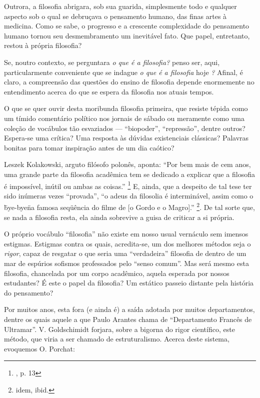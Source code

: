 \documentclass[12pt,a4paper]{article}
\begin{document}
	Outrora, a filosofia abrigara, sob sua guarida, simplesmente todo e 
	qualquer aspecto sob o qual se debruçava o pensamento humano, das 
	finas artes à medicina. Como se sabe, o progresso e a crescente 
	complexidade do pensamento humano tornou seu desmembramento um 
	inevitável fato. Que papel, entretanto, restou à própria filosofia? 

	Se, noutro contexto, se perguntara \textit{o que é a filosofia?} 
	penso ser, aqui, particularmente conveniente que se indague 
	\textit{o que é a filosofia} hoje \textit{?} Afinal, é claro, 
	a compreensão das questões do ensino de filosofia depende 
	enormemente no entendimento acerca do que se espera da filosofia 
	nos atuais tempos. 

	O que se quer ouvir desta moribunda filosofia primeira, que 
	resiste tépida como um tímido comentário político nos jornais de 
	sábado ou meramente como uma coleção de vocábulos tão esvaziados 
	--- “biopoder”, “repressão”, dentre outros? Espera-se uma crítica? 
	Uma resposta às dúvidas existenciais clássicas? Palavras bonitas 
	para tomar inspiração antes de um dia caótico? 

	Leszek Kolakowski, arguto filósofo polonês, aponta: “Por bem mais 
	de cem anos, uma grande parte da filosofia acadêmica tem se 
	dedicado a explicar que a filosofia é impossível, inútil ou 
	ambas as coisas.” \footnote{\cite{lkmeta}, p. 13}
	E, ainda, que a despeito de tal tese ter sido 
	inúmeras vezes “provada”, “o adeus da filosolia é interminável, assim 
	como o \"bye-bye\" na famosa seqüência do filme de [o Gordo e o Magro].”
	\footnote{idem, ibid.}. De tal sorte que, se nada a filosofia 
	resta, ela ainda sobrevive a guisa de criticar a si própria. 

	O próprio vocábulo “filosofia” não existe em nosso usual vernáculo 
	sem imensos estigmas. Estigmas contra os quais, acredita-se, um 
	dos melhores métodos seja o \textit{rigor}, capaz de resgatar o que 
	seria uma “verdadeira” filosofia de dentro de um mar de espúrios 
	sofismos professados pelo “senso comum”. Mas será mesmo esta 
	filosofia, chancelada por um corpo acadêmico, aquela esperada 
	por nossos estudantes? É este o papel da filosofia? Um estático 
	passeio distante pela história do pensamento? 

	Por muitos anos, esta fora (e ainda é) a saída adotada por 
	muitos departamentos, dentre os quais aquele a que Paulo Arantes 
	chama de “Departamento Francês de Ultramar”. V. Goldschimidt 
	forjara, sobre a bigorna do rigor científico, este método, 
	que viria a ser chamado de estruturalismo. Acerca deste sistema, 
	evoquemos O. Porchat: 
\end{document}
